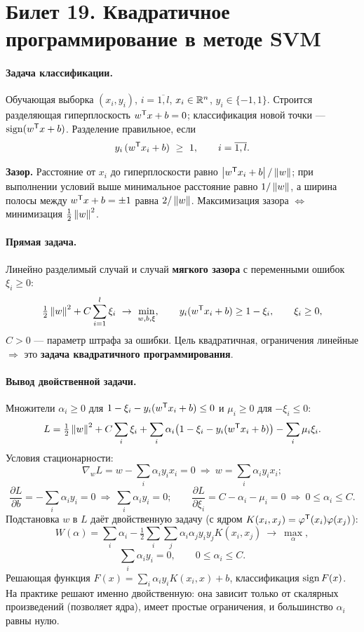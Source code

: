 \section{Билет 19. Квадратичное программирование в методе SVM}


\paragraph{Задача классификации.}
Обучающая выборка $(x_i, y_i)$, $i = \overline{1,l}$, $x_i \in \mathbb{R}^n$,
$y_i \in \{-1, 1\}$. Строится разделяющая гиперплоскость $w^{\mathsf{T}} x + b = 0$;
классификация новой точки — $\operatorname{sign}(w^{\mathsf{T}} x + b)$. Разделение правильное, если
\[
  y_i\,(w^{\mathsf{T}} x_i + b) \ \ge\ 1 , \qquad i = \overline{1,l} .
\]

\textbf{Зазор.} Расстояние от $x_i$ до гиперплоскости равно
$\left\lvert w^{\mathsf{T}} x_i + b \right\rvert/\left\lVert w \right\rVert$; при выполнении условий выше минимальное
расстояние равно $1/\left\lVert w \right\rVert$, а ширина полосы между $w^{\mathsf{T}} x + b = \pm1$ равна
$2/\left\lVert w \right\rVert$. Максимизация зазора $\iff$ минимизация $\tfrac12\left\lVert w \right\rVert^2$.

\paragraph{Прямая задача.}
Линейно разделимый случай и случай \textbf{мягкого зазора} с переменными
ошибок $\xi_i \ge 0$:
\[
  \tfrac12\norm{w}^2 + C\sum_{i=1}^{l}\xi_i \ \to\ \min_{w,b,\xi} ,
  \qquad
  y_i(w\T x_i + b) \ge 1 - \xi_i , \qquad \xi_i \ge 0 ,
\]
$C > 0$ — параметр штрафа за ошибки. Цель квадратичная, ограничения линейные
$\Rightarrow$ это \textbf{задача квадратичного программирования}.

\paragraph{Вывод двойственной задачи.}
Множители $\alpha_i \ge 0$ для $1 - \xi_i - y_i(w^{\mathsf{T}} x_i + b) \le 0$ и
$\mu_i \ge 0$ для $-\xi_i \le 0$:
\[
  L = \tfrac12\left\lVert w \right\rVert^2 + C\sum_i \xi_i
    + \sum_i \alpha_i\big(1 - \xi_i - y_i(w^{\mathsf{T}} x_i + b)\big)
    - \sum_i \mu_i\xi_i .
\]
Условия стационарности:
\[
  \nabla_w L = w - \sum_i \alpha_i y_i x_i = 0
  \ \Rightarrow\ w = \sum_i \alpha_i y_i x_i ;
\]
\[
  \frac{\partial L}{\partial b} = -\sum_i \alpha_i y_i = 0
  \ \Rightarrow\ \sum_i \alpha_i y_i = 0 ;
  \qquad
  \frac{\partial L}{\partial \xi_i} = C - \alpha_i - \mu_i = 0
  \ \Rightarrow\ 0 \le \alpha_i \le C .
\]
Подстановка $w$ в $L$ даёт двойственную задачу (с ядром
$K(x_i,x_j) = \varphi^{\mathsf{T}}(x_i)\varphi(x_j)$):
\[
  W(\alpha) = \sum_{i} \alpha_i
   - \tfrac12\sum_{i}\sum_{j}\alpha_i\alpha_j y_i y_j K(x_i,x_j)
   \ \to\ \max_\alpha ,
\]
\[
  \sum_i \alpha_i y_i = 0 , \qquad 0 \le \alpha_i \le C .
\]
Решающая функция $F(x) = \sum_i \alpha_i y_i K(x_i, x) + b$, классификация
$\operatorname{sign} F(x)$. На практике решают именно двойственную: она зависит только от
скалярных произведений (позволяет ядра), имеет простые ограничения, и
большинство $\alpha_i$ равны нулю.

